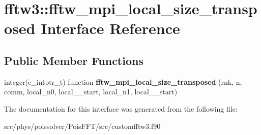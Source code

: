 \hypertarget{interfacefftw3_1_1fftw__mpi__local__size__transposed}{}\section{fftw3\+:\+:fftw\+\_\+mpi\+\_\+local\+\_\+size\+\_\+transposed Interface Reference}
\label{interfacefftw3_1_1fftw__mpi__local__size__transposed}
\subsection*{Public Member Functions}
\begin{DoxyCompactItemize}
\item 
integer(c\+\_\+intptr\+\_\+t) function {\bfseries fftw\+\_\+mpi\+\_\+local\+\_\+size\+\_\+transposed} (rnk, n, comm, local\+\_\+n0, local\+\_\+\_\+start, local\+\_\+n1, local\+\_\+\_\+start)\hypertarget{interfacefftw3_1_1fftw__mpi__local__size__transposed_a4acd374c5910f4a59db9218e8acf724f}{}\label{interfacefftw3_1_1fftw__mpi__local__size__transposed_a4acd374c5910f4a59db9218e8acf724f}

\end{DoxyCompactItemize}


The documentation for this interface was generated from the following file\+:\begin{DoxyCompactItemize}
\item 
src/phys/poissolver/\+Pois\+F\+F\+T/src/customfftw3.\+f90\end{DoxyCompactItemize}
